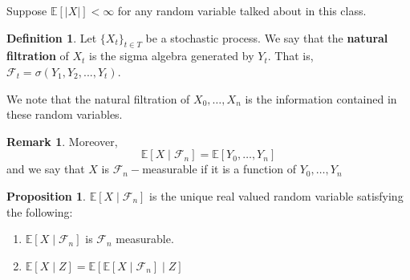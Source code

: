 \documentclass[10pt, oneside]{article}
\newcommand{\bbE}{\mathbb{E}}
\theoremstyle{definition}
\newtheorem{defn}{Definition}
\newtheorem{prop}{Proposition}
\newtheorem{rem}{Remark}
\begin{document}
Suppose $\bbE[|X|] < \infty$ for any random variable talked about in this class.
\begin{defn}
 Let $\{X_t\}_{t∈T}$ be a stochastic process. We say that the \textbf{natural filtration} of $X_t$ is the sigma algebra generated by $Y_t$. That is,
 $\mathcal{F}_t =\sigma(Y_1,Y_2,...,Y_t)$.
\end{defn}
We note that the natural filtration of $X_0, \dots, X_n$ is the information contained in these random variables. 
\begin{rem}
    Moreover, 
    \[\bbE[X \mid \mathcal{F}_n] = \bbE[Y_0, \dots, Y_n]\]
 and we say that $X$ is $\mathcal{F}_n-$measurable if it is a function of $Y_0, \dots, Y_n$
 \end{rem}
 \begin{prop}
     $\bbE[X \mid \mathcal{F}_n]$ is the unique real valued random variable satisfying the following:
     \begin{enumerate}
         \item $\bbE[X \mid \mathcal{F}_n]$ is $\mathcal{F}_n$ measurable.
         \item $\bbE[X \mid Z] = \bbE[\bbE[X \mid \mathcal{F}_n] \mid Z]$
     \end{enumerate}
 \end{prop}
\end{document}
